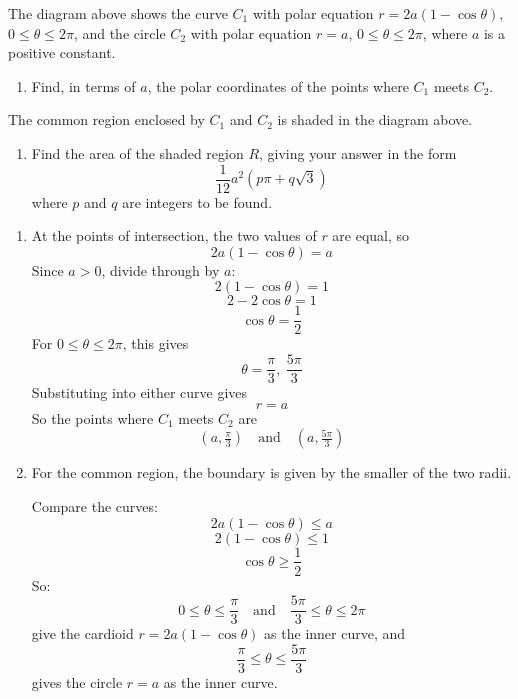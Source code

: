 \documentclass[leqno]{article}
\begin{document}
\begin{enumerate}[
	  label=\textbf{\arabic*.},
	  leftmargin=*,
	  topsep=0pt,
	  partopsep=0pt,
	  parsep=0pt
	]
	
	The diagram above shows the curve $C_1$ with polar equation $r=2a(1-\cos\theta)$, $0\leq\theta\leq2\pi$, and the circle $C_2$ with polar equation $r=a$, $0\leq\theta\leq2\pi$, where $a$ is a positive constant. \\
	\begin{enumerate}[label=\textbf{(\alph*)}]
	  \item Find, in terms of $a$, the polar coordinates of the points where $C_1$ meets $C_2$.  \\
	\end{enumerate}
	The common region enclosed by $C_1$ and $C_2$ is shaded in the diagram above. \\
	\begin{enumerate}[label=\textbf{(\alph*)}, resume]
	  \item Find the area of the shaded region $R$, giving your answer in the form
	  \[
	  \frac{1}{12}a^2\left(p\pi+q\sqrt{3}\right)
	  \]
	  where $p$ and $q$ are integers to be found.  \\
	\end{enumerate}
	
	\vspace*{30pt}
	
	\begin{tcolorbox}[colback=white, colframe=scarlet, title={\textbf{Solution}}, breakable, grow to left by=6mm, grow to right by=10mm]
	\begin{enumerate}[label=\textbf{(\alph*)}]
	  \item At the points of intersection, the two values of $r$ are equal, so
	\[
	2a(1-\cos\theta)=a
	\]
	Since $a>0$, divide through by $a$:
	\[
	2(1-\cos\theta)=1
	\]
	\[
	2-2\cos\theta=1
	\]
	\[
	\cos\theta=\frac12
	\]
	For $0\le \theta\le 2\pi$, this gives
	\[
	\theta=\frac{\pi}{3},\ \frac{5\pi}{3}
	\]
	Substituting into either curve gives
	\[
	r=a
	\]
	So the points where $C_1$ meets $C_2$ are
	\[
	(a,\tfrac{\pi}{3}) \quad \text{and} \quad (a,\tfrac{5\pi}{3})
	\]
	  \item For the common region, the boundary is given by the smaller of the two radii.
	
	Compare the curves:
	\[
	2a(1-\cos\theta)\le a
	\]
	\[
	2(1-\cos\theta)\le 1
	\]
	\[
	\cos\theta\ge \frac12
	\]
	So:
	\[
	0\le \theta\le \frac{\pi}{3}
	\quad \text{and} \quad
	\frac{5\pi}{3}\le \theta\le 2\pi
	\]
	give the cardioid $r=2a(1-\cos\theta)$ as the inner curve, and
	\[
	\frac{\pi}{3}\le \theta\le \frac{5\pi}{3}
	\]
	gives the circle $r=a$ as the inner curve.
	

\end{enumerate}
\end{tcolorbox}
\end{enumerate}
\end{document}
